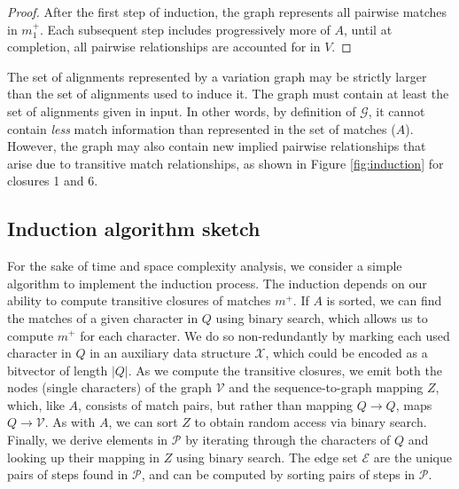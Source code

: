 \documentclass{bioinfo}
\theoremstyle{definition}
\begin{document}
\begin{proof}
After the first step of induction, the graph represents all pairwise matches in $m_1^+$.
Each subsequent step includes progressively more of $A$, until at completion, all pairwise relationships are accounted for in $V$.
\end{proof}

The set of alignments represented by a variation graph may be strictly larger than the set of alignments used to induce it.
The graph must contain at least the set of alignments given in input.
In other words, by definition of $\mathcal{G}$, it cannot contain \textit{less} match information than represented in the set of matches ($A$).
However, the graph may also contain new implied pairwise relationships that arise due to transitive match relationships, as shown in Figure \ref{fig:induction} for closures 1 and 6.



\subsection{Induction algorithm sketch}

For the sake of time and space complexity analysis, we consider a simple algorithm to implement the induction process.
The induction depends on our ability to compute transitive closures of matches $m^+$.
If $A$ is sorted, we can find the matches of a given character in $Q$ using binary search, which allows us to compute $m^+$ for each character.
We do so non-redundantly by marking each used character in $Q$ in an auxiliary data structure $\mathcal{X}$, which could be encoded as a bitvector of length $|Q|$.
As we compute the transitive closures, we emit both the nodes (single characters) of the graph $\mathcal{V}$ and the sequence-to-graph mapping $Z$, which, like $A$, consists of match pairs, but rather than mapping $Q \to Q$, maps $Q \to \mathcal{V}$.
As with $A$, we can sort $Z$ to obtain random access via binary search.
Finally, we derive elements in $\mathcal{P}$ by iterating through the characters of $Q$ and looking up their mapping in $Z$ using binary search.
The edge set $\mathcal{E}$ are the unique pairs of steps found in $\mathcal{P}$, and can be computed by sorting pairs of steps in $\mathcal{P}$.
\end{document}
